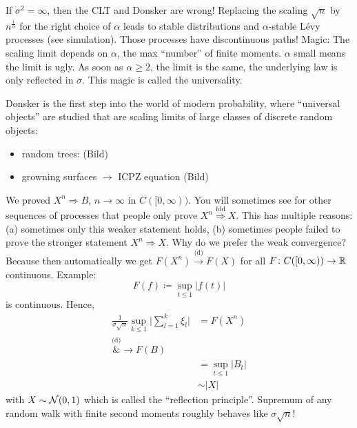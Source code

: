 	If $\sigma^2=\infty$, then the CLT and Donsker are wrong! Replacing the scaling $\sqrt{n}$ by $n^{\frac{1}{\alpha}}$ for the right choice of $\alpha$ leads to stable distributions and $\alpha$-stable L\'evy processes (see simulation). Those processes have discontinuous paths! Magic: The scaling limit depends on $\alpha$, the max \enquote{number} of finite moments. $\alpha$ small means the limit is ugly. As soon as $\alpha\geq 2$, the limit is \underline{} the same, the underlying law is only reflected in $\sigma$. This magic is called the universality.
\begin{bem1}
	Donsker is the first step into the world of modern probability, where \enquote{universal objects} are studied that are scaling limits of large classes of discrete random objects:
	\begin{itemize}
		\item random trees: (Bild)
		\item growning surfaces $\to$ ICPZ equation (Bild)
	\end{itemize}
\end{bem1}
\begin{bem1}
	We proved $X^n \Rightarrow B$, $n\to\infty$ in $C([0,\infty))$. You will sometimes see for other sequences of processes that people only prove $X^n \overset{\text{fdd}}{\Rightarrow} X$. This has multiple reasons: (a) sometimes only this weaker statement holds, (b) sometimes people failed to prove the stronger statement $X^n \Rightarrow X$. Why do we prefer the weak convergence? Because then automatically we get $F(X^n) \overset{\text{(d)}}{\longrightarrow}F(X)$ for all $F \colon  C([0,\infty)) \to \mathbb{R}$ continuous. Example:
	$$F(f) \coloneqq \sup_{t\leq 1} \lvert f(t)\rvert$$
	is continuous. Hence,
	\begin{align*}
		\frac{1}{\sigma\sqrt{n}} \sup_{k\leq 1} \lvert \sum_{l=1}^k \xi_l \rvert &= F(X^n) \\
			\overset{\text{(d)}}&{\longrightarrow} F(B) \\
			&= \sup_{t\leq 1} \lvert B_t \rvert \\
			&\sim \lvert X \rvert
	\end{align*}
	with $X\sim \mathcal{N}(0,1)$ which is called the \enquote{reflection principle}. Supremum of any random walk with finite second moments roughly behaves like $\sigma\sqrt{n}$! 
\end{bem1}
